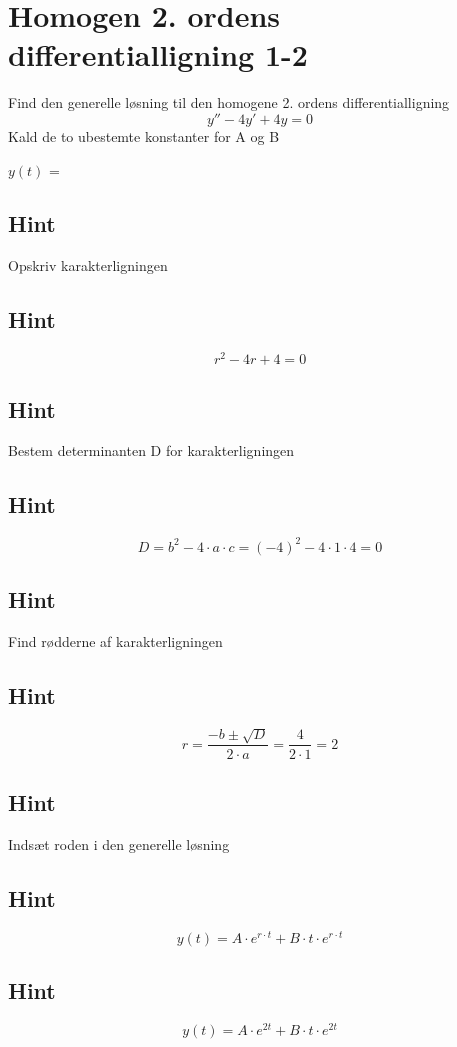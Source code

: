 \documentclass{article}
\newenvironment{exercise}[1]{\newpage\section{#1}}{}
\newcommand{\answerbox}[1]{\fbox{$#1$}}
\newcommand{\hint}{\subsection*{Hint}}
\begin{document}
\begin{exercise}{Homogen 2. ordens differentialligning 1-2}
	
	Find den generelle løsning til den homogene 2. ordens differentialligning
	\[
	y'' - 4y' + 4y = 0
	\]
	Kald de to ubestemte konstanter for A og B
	
	$y(t)$ = \answerbox{A \cdot e^{2t} + B \cdot t \cdot e^{2t}}
	
	
	\hint 
	
	Opskriv karakterligningen
	
	\hint
	
	\[
	r^2 - 4r + 4 = 0
	\]
	
	
	\hint
	
	Bestem determinanten D for karakterligningen
	
	
	\hint 
	\[
	D = b^2 - 4 \cdot a \cdot c = (-4)^2 - 4 \cdot 1 \cdot 4  = 0
	\]
	
	\hint 
	Find rødderne af karakterligningen
	
	
	\hint
	
	\[
	r = \frac{-b \pm \sqrt{D}}{2 \cdot a} = \frac{4}{2 \cdot 1} = 2
	\]
	
	\hint
	
	Indsæt roden i den generelle løsning
	
	\hint
	\[
	y(t) = A \cdot e^{r \cdot t} + B \cdot t \cdot e^{r \cdot t}
	\]
	
	\hint
	
	\[
	y(t) = A \cdot e^{2t} + B \cdot t \cdot e^{2t}
	\]
	
	
\end{exercise}

\newpage
\end{document}
